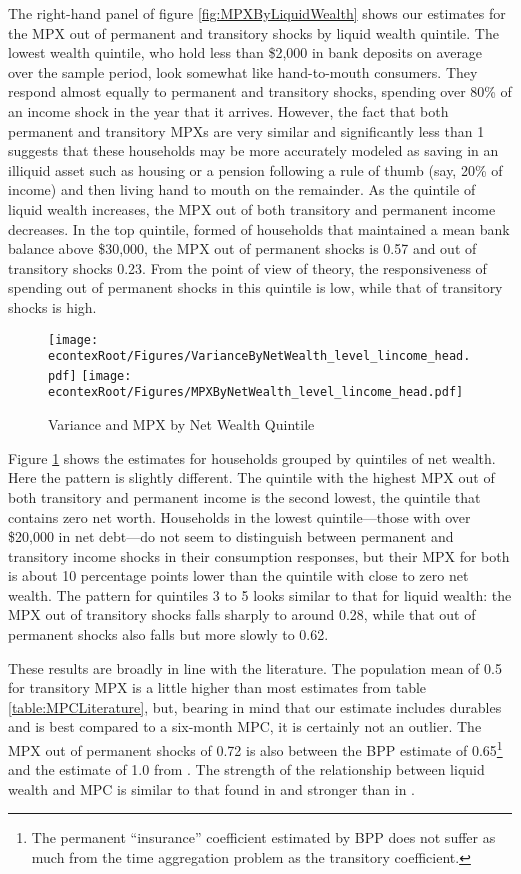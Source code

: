 \documentclass[titlepage]{\econtex}\newcommand{\texname}{ConsumptionHeterogeneity}
\begin{document}
	The right-hand panel of figure \ref{fig:MPXByLiquidWealth} shows our estimates for the MPX out of permanent and transitory shocks by liquid wealth quintile. The lowest wealth quintile, who hold less than \$2,000 in bank deposits on average over the sample period, look somewhat like hand-to-mouth consumers. They respond almost equally to permanent and transitory shocks, spending over 80\% of an income shock in the year that it arrives. However, the fact that both permanent and transitory MPXs are very similar and significantly less than 1 suggests that these households may be more accurately modeled as saving in an illiquid asset such as housing or a pension following a rule of thumb (say, 20\% of income) and then living hand to mouth on the remainder. As the quintile of liquid wealth increases, the MPX out of both transitory and permanent income decreases. In the top quintile, formed of households that maintained a mean bank balance above \$30,000, the MPX out of permanent shocks is 0.57 and out of transitory shocks 0.23. From the point of view of theory, the responsiveness of spending out of permanent shocks in this quintile is low, while that of transitory shocks is high.
	\begin{figure}
		\centering
		\texttt{[image: \\econtexRoot/Figures/VarianceByNetWealth\_level\_lincome\_head.pdf]}
		\centering
		\texttt{[image: \\econtexRoot/Figures/MPXByNetWealth\_level\_lincome\_head.pdf]}
		\caption{Variance and MPX by Net Wealth Quintile}
		\label{fig:MPXByNetWealth}
	\end{figure}
	
	Figure \ref{fig:MPXByNetWealth} shows the estimates for households grouped by quintiles of net wealth. Here the pattern is slightly different. The quintile with the highest MPX out of both transitory and permanent income is the second lowest, the quintile that contains zero net worth. Households in the lowest quintile---those with over \$20,000 in net debt---do not seem to distinguish between permanent and transitory income shocks in their consumption responses, but their MPX for both is about 10 percentage points lower than the quintile with close to zero net wealth. The pattern for quintiles 3 to 5 looks similar to that for liquid wealth: the MPX out of transitory shocks falls sharply to around 0.28, while that out of permanent shocks also falls but more slowly to 0.62.
	
	These results are broadly in line with the literature. The population mean of 0.5 for transitory MPX is a little higher than most estimates from table \ref{table:MPCLiterature}, but, bearing in mind that our estimate includes durables and is best compared to a six-month MPC, it is certainly not an outlier. The MPX out of permanent shocks of 0.72 is also between the BPP estimate of 0.65\footnote{The permanent ``insurance'' coefficient estimated by BPP does not suffer as much from the time aggregation problem as the transitory coefficient.} and the estimate of 1.0 from \cite{gelman_response_2016}. The strength of the relationship between liquid wealth and MPC is similar to that found in \cite{gelman_what_2016} and stronger than in \cite{fagereng_mpc_2016}.
	
\end{document}
